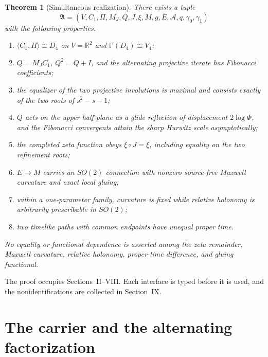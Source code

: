 \documentclass[10pt,oneside]{article}
\theoremstyle{plaincompact}
\newtheorem{theorem}{Theorem}
\theoremstyle{definitioncompact}
\newcommand{\R}{\mathbb R}
\newcommand{\Ad}{\mathcal A}
\begin{document}
\begin{theorem}[Simultaneous realization]\label{thm:main}
There exists a tuple
\[
\mathfrak A=(V,C_1,\Pi,M_J,Q,J,\xi,M,g,E,\Ad,q,\gamma_0,\gamma_1)
\]
with the following properties.
\begin{enumerate}[label=(\roman*),leftmargin=2.25em,itemsep=0.25ex,topsep=0.5ex]
\item $\langle C_1,\Pi\rangle\cong D_4$ on $V=\R^2$ and
      $\mathbb P(D_4)\cong V_4$;
\item $Q=M_JC_1$, $Q^2=Q+I$, and the alternating projective iterate has
      Fibonacci coefficients;
\item the equalizer of the two projective involutions is maximal and consists
      exactly of the two roots of $s^2-s-1$;
\item $Q$ acts on the upper half-plane as a glide reflection of displacement
      $2\log\Phi$, and the Fibonacci convergents attain the sharp Hurwitz scale
      asymptotically;
\item the completed zeta function obeys $\xi\circ J=\xi$, including equality
      on the two refinement roots;
\item $E\to M$ carries an $SO(2)$ connection with nonzero source-free Maxwell
      curvature and exact local gluing;
\item within a one-parameter family, curvature is fixed while relative holonomy
      is arbitrarily prescribable in $SO(2)$;
\item two timelike paths with common endpoints have unequal proper time.
\end{enumerate}
No equality or functional dependence is asserted among the zeta remainder,
Maxwell curvature, relative holonomy, proper-time difference, and gluing
functional.
\end{theorem}

The proof occupies Sections~II--VIII.  Each interface is typed before it is
used, and the nonidentifications are collected in Section~IX.

\section{The carrier and the alternating factorization}
\end{document}
